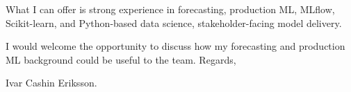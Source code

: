 \documentclass[11pt,a4paper]{moderncv}
\begin{document}
\hspace*{2em}
What I can offer is strong experience in forecasting, production ML, MLflow, Scikit-learn, and Python-based data science, stakeholder-facing model delivery.

\vspace*{2em}
I would welcome the opportunity to discuss how my forecasting and production ML background could be useful to the team. Regards,

\vspace*{1em}
Ivar Cashin Eriksson.
\end{document}
